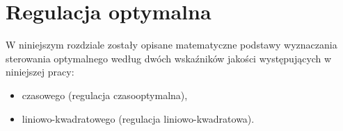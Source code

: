 \chapter{Regulacja optymalna}
\label{cha:reg-opt}


\newtheorem{pontriagin-max}{Zasada maksimum Pontriagina}[chapter]

W niniejszym rozdziale zostały opisane matematyczne podstawy wyznaczania sterowania optymalnego według dwóch wskaźników jakości występujących w niniejszej pracy:
\begin{itemize}
    \item czasowego (regulacja czasooptymalna),
    \item liniowo-kwadratowego (regulacja liniowo-kwadratowa).
\end{itemize}





